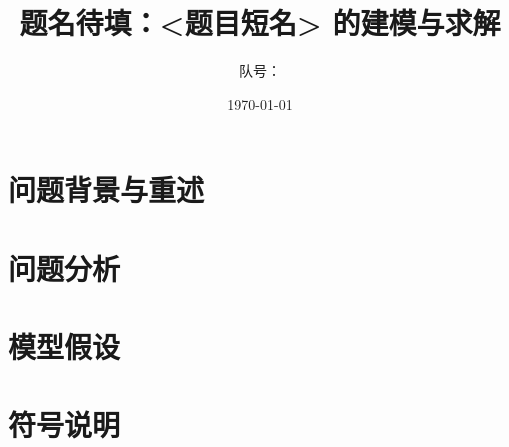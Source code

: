 \documentclass[withoutpreface]{cumcmthesis}
\begin{document}
\title{题名待填：<题目短名> 的建模与求解}
\author{队号：\mcm@tokens@baominghao}  %
\date{\today}

\maketitle

\begin{abstract}
\end{abstract}

\tableofcontents

\section{问题背景与重述}

\section{问题分析}

\section{模型假设}

\section{符号说明}
\end{document}
